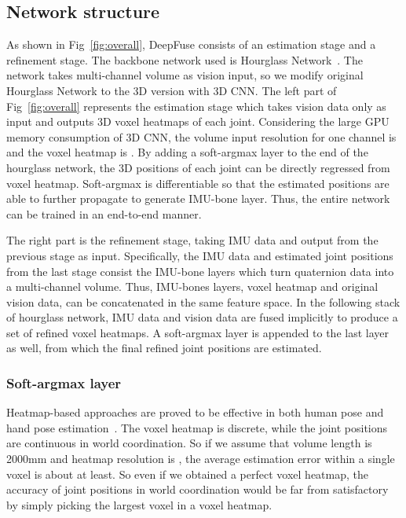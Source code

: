 \documentclass[10pt,twocolumn,letterpaper]{article}
\begin{document}
\subsection{Network structure}
As shown in Fig~\ref{fig:overall}, DeepFuse consists of an estimation stage and a refinement stage. The backbone network used is Hourglass Network~\cite{newell2016stacked}. The network takes multi-channel volume as vision input, so we modify original Hourglass Network to the 3D version with 3D CNN. The left part of Fig~\ref{fig:overall} represents the estimation stage which takes vision data only as input and outputs 3D voxel heatmaps of each joint. Considering the large GPU memory consumption of 3D CNN, the volume input resolution for one channel is  and the voxel heatmap is . By adding a soft-argmax layer to the end of the hourglass network, the 3D positions of each joint can be directly regressed from voxel heatmap. Soft-argmax is differentiable so that the estimated positions are able to further propagate to generate IMU-bone layer. Thus, the entire network can be trained in an end-to-end manner.

The right part is the refinement stage, taking IMU data and output from the previous stage as input. Specifically, the IMU data and estimated joint positions from the last stage consist the IMU-bone layers which turn quaternion data into a multi-channel volume. Thus, IMU-bones layers, voxel heatmap and original vision data, can be concatenated in the same feature space. In the following stack of hourglass network, IMU data and vision data are fused implicitly to produce a set of refined voxel heatmaps. A soft-argmax layer is appended to the last layer as well, from which the final refined joint positions are estimated.  
\vspace{-0.4cm}
\subsubsection{Soft-argmax layer }
\label{sec:sal}
Heatmap-based approaches are proved to be effective in both human pose and hand pose estimation~\cite{newell2016stacked,huang2018}. The voxel heatmap is discrete, while the joint positions are continuous in world coordination. So if we assume that volume length is 2000mm and heatmap resolution is , the average estimation error within a single voxel is about  at least. So even if we obtained a perfect voxel heatmap, the accuracy of joint positions in world coordination would be far from satisfactory by simply picking the largest voxel in a voxel heatmap. 
\end{document}
